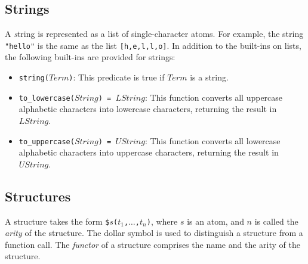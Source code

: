 \subsection{\label{subsec:strings}Strings}
A {\emph string} is represented as a list of single-character atoms. For example, the string \texttt{"hello"} is the same as the list \texttt{[h,e,l,l,o]}. In addition to the built-ins on lists, the following built-ins are provided for strings:
\begin{itemize}
\item \texttt{string($Term$)}: This predicate is true if $Term$ is a string. 
\item \texttt{to\_lowercase($String$) = $LString$}: This function converts all uppercase alphabetic characters into lowercase characters, returning the result in $LString$.
\item \texttt{to\_uppercase($String$) = $UString$}: This function converts all lowercase alphabetic characters into uppercase characters, returning the result in $UString$.
\end{itemize}

\subsection{Structures}
A structure takes the form \texttt{\$$s$($t_1$,$\ldots$,$t_{n}$)}, where $s$ is an atom, and $n$ is called the \emph{arity} of the structure. The dollar symbol is used to distinguish a structure from a function call. The \emph{functor} of a structure comprises the name and the arity of the structure. 

